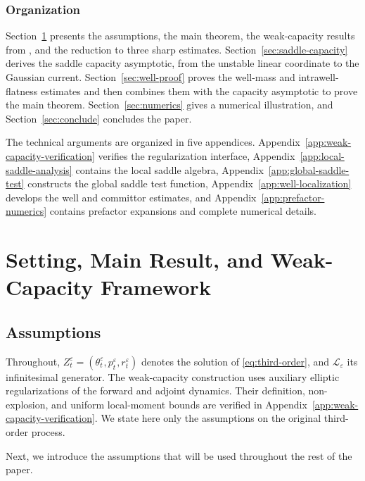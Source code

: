 \documentclass[11pt]{article}
\numberwithin{equation}{section}
\theoremstyle{plain}
\theoremstyle{definition}
\theoremstyle{remark}
\newcommand{\eps}{\varepsilon}
\newcommand{\calL}{\mathcal L}
\begin{document}
\subsubsection*{Organization}
Section~\ref{sec:main} presents the assumptions, the main theorem, the
weak-capacity results from \cite{HeLiWangZhu2026WeakEquilibrium}, and the
reduction to three sharp estimates.  Section~\ref{sec:saddle-capacity}
derives the saddle capacity asymptotic, from the unstable linear coordinate to
the Gaussian current.  Section~\ref{sec:well-proof} proves the well-mass and
intrawell-flatness estimates and then combines them with the capacity
asymptotic to prove the main theorem.  Section~\ref{sec:numerics} gives a
numerical illustration, and Section~\ref{sec:conclude} concludes the paper.

The technical arguments are organized in five appendices.  Appendix~\ref{app:weak-capacity-verification}
verifies the regularization interface, Appendix~\ref{app:local-saddle-analysis}
contains the local saddle algebra, Appendix~\ref{app:global-saddle-test}
constructs the global saddle test function, Appendix~\ref{app:well-localization}
develops the well and committor estimates, and Appendix~\ref{app:prefactor-numerics}
contains prefactor expansions and complete numerical details.
\section{Setting, Main Result, and Weak-Capacity Framework}
\label{sec:main}

\subsection{Assumptions}

Throughout, $Z_t^\eps=(\theta_t^\eps,p_t^\eps,r_t^\eps)$ denotes the solution
of \eqref{eq:third-order}, and $\calL_\eps$ its infinitesimal generator.
The weak-capacity construction uses auxiliary elliptic regularizations
of the forward and adjoint dynamics.  Their definition, non-explosion, and
uniform local-moment bounds are verified in Appendix~\ref{app:weak-capacity-verification}.  We
state here only the assumptions on the original third-order process.

Next, we introduce the assumptions that will be used throughout the rest of the paper.
\end{document}
